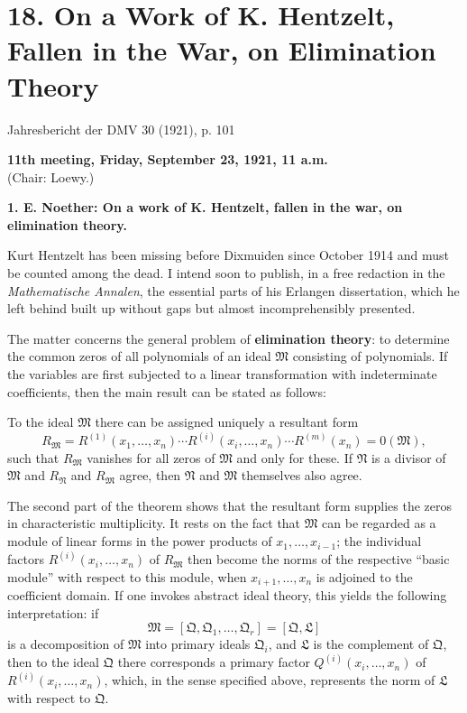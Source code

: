 \section*{18. On a Work of K. Hentzelt, Fallen in the War, on Elimination Theory}
\begin{center}
Jahresbericht der DMV 30 (1921), p. 101
\end{center}

\begin{center}
\textbf{11th meeting, Friday, September 23, 1921, 11 a.m.}\\
(Chair: Loewy.)
\end{center}

\textbf{1. E. Noether: On a work of K. Hentzelt, fallen in the war, on elimination theory.}

Kurt Hentzelt has been missing before Dixmuiden since October 1914 and must be counted among the dead. I intend soon to publish, in a free redaction in the \emph{Mathematische Annalen}, the essential parts of his Erlangen dissertation, which he left behind built up without gaps but almost incomprehensibly presented.

The matter concerns the general problem of \textbf{elimination theory}: to determine the common zeros of all polynomials of an ideal $\mathfrak M$ consisting of polynomials. If the variables are first subjected to a linear transformation with indeterminate coefficients, then the main result can be stated as follows:

To the ideal $\mathfrak M$ there can be assigned uniquely a resultant form
\[
 R_{\mathfrak M}=R^{(1)}(x_1,
\ldots,x_n)\cdots R^{(i)}(x_i,
\ldots,x_n)\cdots R^{(m)}(x_n)=0(\mathfrak M),
\]
such that $R_{\mathfrak M}$ vanishes for all zeros of $\mathfrak M$ and only for these. If $\mathfrak N$ is a divisor of $\mathfrak M$ and $R_{\mathfrak N}$ and $R_{\mathfrak M}$ agree, then $\mathfrak N$ and $\mathfrak M$ themselves also agree.

The second part of the theorem shows that the resultant form supplies the zeros in characteristic multiplicity. It rests on the fact that $\mathfrak M$ can be regarded as a module of linear forms in the power products of $x_1,
\ldots,x_{i-1}$; the individual factors $R^{(i)}(x_i,
\ldots,x_n)$ of $R_{\mathfrak M}$ then become the norms of the respective ``basic module'' with respect to this module, when $x_{i+1},
\ldots,x_n$ is adjoined to the coefficient domain. If one invokes abstract ideal theory, this yields the following interpretation: if
\[
 \mathfrak M=[\mathfrak Q,\mathfrak Q_1,
\ldots,
\mathfrak Q_r]=[\mathfrak Q,\mathfrak L]
\]
is a decomposition of $\mathfrak M$ into primary ideals $\mathfrak Q_i$, and $\mathfrak L$ is the complement of $\mathfrak Q$, then to the ideal $\mathfrak Q$ there corresponds a primary factor $Q^{(i)}(x_i,
\ldots,x_n)$ of $R^{(i)}(x_i,
\ldots,x_n)$, which, in the sense specified above, represents the norm of $\mathfrak L$ with respect to $\mathfrak Q$.
